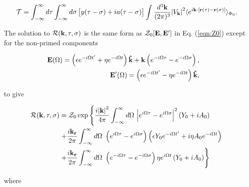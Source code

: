 \begin{equation}\label{eqn:fhip_genfun}
    \begin{gathered}
        \mathcal{T} = \int^\infty_{-\infty} d\tau \int^\infty_{-\infty} d\sigma \left[ y(\tau - \sigma) + ia(\tau - \sigma) \right] \int \frac{d^3\vb{k}}{(2\pi)^3} \abs{V_{\vb{k}}}^2 \langle  e^{i \vb{k} \cdot [\vb{r}(\tau) - \vb{r}(\sigma)]} \rangle_{\Phi_0}.
    \end{gathered}
\end{equation} 

The solution to $\mathcal{R}(\vb{k}, \tau, \sigma)$ is the same form as $\mathcal{Z}_0[\vb{E}, \vb{E'}]$ in Eq. (\ref{eqn:Z0}) except for the non-primed components

\begin{subequations}
\begin{align}
    \begin{split}
        \vb{E}(\Omega) &= \left(\epsilon e^{-i\Omega t'} + \eta e^{-i\Omega t}\right) \vb{\hat{k}} + \vb{k} \left(e^{-i\Omega \tau} - e^{-i\Omega \sigma}\right),
    \end{split}\\
    \begin{split}
        \vb{E'}(\Omega) &= \left(\epsilon e^{-i\Omega t'} - \eta e^{-i\Omega t}\right) \vb{\hat{k}},
    \end{split}
\end{align}
\end{subequations}

to give

\begin{equation}
    \begin{aligned}
        \mathcal{R}(\vb{k}, \tau, \sigma) &= \mathcal{Z}_0 \exp \left\{ \frac{i \abs{\vb{k}}^2}{4\pi} \int^\infty_{-\infty} d\Omega\ \abs{e^{i\Omega \tau} - e^{i\Omega \sigma}}^2 \left( Y_0 + i A_0 \right) \right. \\
        &\left. + \frac{i \vb{k}_{\vb{r}}}{2\pi} \int^\infty_{-\infty} d\Omega\ \left(e^{i\Omega \tau} - e^{i\Omega \sigma}\right)\left(\epsilon Y_0 e^{-i\Omega t'} + i \eta A_0 e^{-i\Omega t}\right) \right. \\
        &\left. + \frac{i \vb{k}_{\vb{r}}}{2\pi}  \int^\infty_{-\infty} d\Omega\ \left(e^{-i\Omega \tau} - e^{-i\Omega \sigma}\right) \eta e^{i\Omega t} \left( Y_0 + i A_0 \right) \right\}
    \end{aligned}
\end{equation}

where


